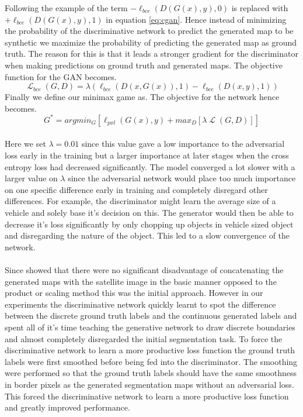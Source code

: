 \documentclass{kththesis}
\DeclareMathOperator{\Lagr}{\mathcal{L}}
\begin{document}
Following the example of \cite{goodfellow_generative_2014, luc_semantic_2016} the term $-\ell_{bce}(D(G(x),y), 0)$  is replaced with  $+\ell_{bce}(D(G(x),y), 1)$ in equation \ref{eq:cgan}. Hence instead of minimizing the probability of the discriminative network to predict the generated map to be synthetic we maximize the probability of predicting the generated map as ground truth. The reason for this is that it leads a stronger gradient for the discriminator when making predictions on ground truth and generated maps. The objective function for the GAN becomes.
\begin{equation}
\Lagr_{bce}(G, D) =\lambda(\ell_{bce}(D(x,G(x)), 1)-\ell_{bce}(D(x,y), 1))
\end{equation}
Finally we define our minimax game as.
The objective for the network hence becomes.
\begin{equation}
G^{*}=argmin_{G}[\ell_{pxl}(G(x),y) + max_{D}[\lambda\Lagr(G, D)] ]
\end{equation}
\\
Here we set $\lambda=0.01$ since this value gave a low importance to the adversarial loss early in the training but a larger importance at later stages when the cross entropy loss had decreased significantly. The model converged a lot slower with a larger value on $\lambda$ since the adversarial network would place too much importance on one specific difference early in training and completely disregard other differences. For example, the discriminator might learn the average size of a vehicle and solely base it's decision on this. The generator would then be able to decrease it's loss significantly by only chopping up objects in vehicle sized object and disregarding the nature of the object. This led to a slow convergence of the network.\\
\\
Since \cite{luc_semantic_2016} showed that there were no significant disadvantage of concatenating the generated maps with the satellite image in the basic manner opposed to the product or scaling method this was the initial approach. However in our experiments the discriminative network quickly learnt to spot the difference between the discrete ground truth labels and the continuous generated labels and spent all of it's time teaching the generative network to draw discrete boundaries and almost completely disregarded the initial segmentation task. To force the discriminative network to learn a more productive loss function the ground truth labels were first smoothed before being fed into the discriminator. The smoothing were performed so that the ground truth labels should have the same smoothness in border pixels as the generated segmentation maps without an adversarial loss. This forced the discriminative network to learn a more productive loss function and greatly improved performance.\\
\end{document}
